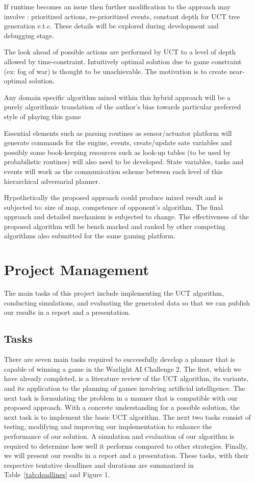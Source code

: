 \documentclass[a4paper,11pt]{article}
\begin{document}
If runtime becomes an issue then further modification to the approach may involve : prioritized actions, re-prioritized events, constant depth for UCT tree generation e.t.c. These details will be explored during development and debugging stage.

The look ahead of possible actions are performed by UCT to a level of depth allowed by time-constraint. Intuitively optimal solution due to game constraint (ex: fog of war) is thought to be unachievable. The motivation is to create near-optimal solution.

Any domain specific algorithm mixed within this hybrid approach will be a purely algorithmic translation of the author’s bias towards particular preferred style of playing this game

Essential elements such as parsing routines as sensor/actuator platform will generate commands for the engine, events, create/update sate variables and possibly some book-keeping resources such as look-up tables (to be used by probabilistic routines) will also need to be developed. State variables, tasks and events will work as the  communication scheme between each level of this hierarchical adversarial planner.

Hypothetically the proposed approach could produce mixed result and is subjected to: size of map, competence of opponent’s algorithm. The final approach and detailed mechanism is subjected to change. The effectiveness of the proposed algorithm will be bench marked and ranked by other competing algorithms also submitted for the same gaming platform.


%
\section{Project Management}\label{sec:management}
The main tasks of this project include implementing the UCT algorithm, conducting simulations, and evaluating the generated data so that we can publish our results in a report and a presentation. 

\subsection{Tasks}\label{sec:tasks}
There are seven main tasks required to successfully develop a planner that is capable of winning a game in the Warlight AI Challenge 2.  The first, which we have already completed, is a literature review of the UCT algorithm, its variants, and its application to the planning of games involving artificial intelligence. The next task is formulating the problem in a manner that is compatible with our proposed approach. With a concrete understanding for a possible solution, the next task is to implement the basic UCT algorithm.  The next two tasks consist of testing, modifying and improving our implementation to enhance the performance of our solution.  A simulation and evaluation of our algorithm is required to determine how well it performs compared to other strategies. Finally, we will present our results in a report and a presentation.  These tasks, with their respective tentative deadlines and durations are summarized in Table~\ref{tab:deadlines} and Figure 1. %
\end{document}
